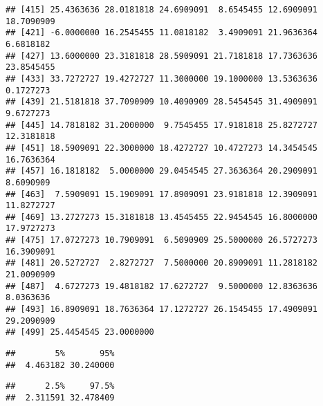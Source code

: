 \documentclass[]{book}
\newenvironment{Shaded}{\begin{snugshade}}{\end{snugshade}}
\newcommand{\CommentTok}[1]{\textcolor[rgb]{0.56,0.35,0.01}{\textit{#1}}}
\newcommand{\FloatTok}[1]{\textcolor[rgb]{0.00,0.00,0.81}{#1}}
\newcommand{\KeywordTok}[1]{\textcolor[rgb]{0.13,0.29,0.53}{\textbf{#1}}}
\newcommand{\NormalTok}[1]{#1}
\begin{document}
\begin{verbatim}
## [415] 25.4363636 28.0181818 24.6909091  8.6545455 12.6909091 18.7090909
## [421] -6.0000000 16.2545455 11.0818182  3.4909091 21.9636364  6.6818182
## [427] 13.6000000 23.3181818 28.5909091 21.7181818 17.7363636 23.8545455
## [433] 33.7272727 19.4272727 11.3000000 19.1000000 13.5363636  0.1727273
## [439] 21.5181818 37.7090909 10.4090909 28.5454545 31.4909091  9.6727273
## [445] 14.7818182 31.2000000  9.7545455 17.9181818 25.8272727 12.3181818
## [451] 18.5909091 22.3000000 18.4272727 10.4727273 14.3454545 16.7636364
## [457] 16.1818182  5.0000000 29.0454545 27.3636364 20.2909091  8.6090909
## [463]  7.5909091 15.1909091 17.8909091 23.9181818 12.3909091 11.8272727
## [469] 13.2727273 15.3181818 13.4545455 22.9454545 16.8000000 17.9727273
## [475] 17.0727273 10.7909091  6.5090909 25.5000000 26.5727273 16.3909091
## [481] 20.5272727  2.8272727  7.5000000 20.8909091 11.2818182 21.0090909
## [487]  4.6727273 19.4818182 17.6272727  9.5000000 12.8363636  8.0363636
## [493] 16.8909091 18.7636364 17.1272727 26.1545455 17.4909091 29.2090909
## [499] 25.4454545 23.0000000
\end{verbatim}

\begin{Shaded}
\end{Shaded}

\begin{verbatim}
##        5%       95% 
##  4.463182 30.240000
\end{verbatim}

\begin{Shaded}
\end{Shaded}

\begin{verbatim}
##      2.5%     97.5% 
##  2.311591 32.478409
\end{verbatim}

\begin{Shaded}
\end{Shaded}
\end{document}
